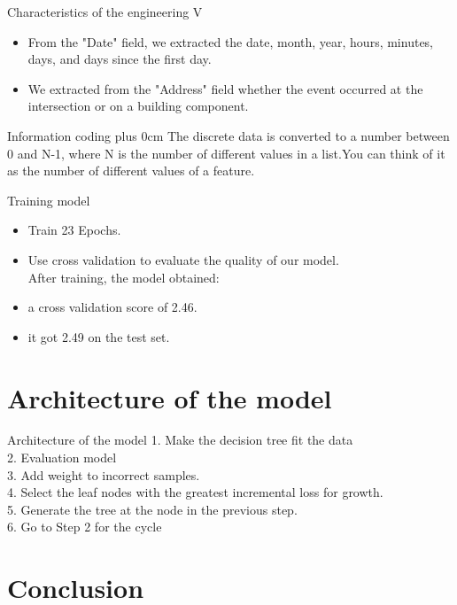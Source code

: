 \documentclass[
 size=14pt,
 paper=smartboard,  %
 mode=present, 		%
 display=slides, 	%
 style=tuliplab,  	%
 pauseslide,
 fleqn,leqno]{powerdot}
\renewcommand{\raggedright}{\leftskip=0pt \rightskip=0pt plus 0cm}
\begin{document}
\begin{slide}[toc=,bm=]{Characteristics of the engineering V}
	\begin{itemize}
		\item From the "Date" field, we extracted the date, month, year, hours, minutes, days, and days since the first day.
		\item We extracted from the "Address" field whether the event occurred at the intersection or on a building component.
	\end{itemize}
\end{slide}
\begin{slide}{Information coding}
	\raggedright
	The discrete data is converted to a number between 0 and N-1, where N is the number of different values in a list.You can think of it as the number of different values of a feature.
\end{slide}
\begin{slide}{Training model}
	\begin{itemize}
	\item Train 23 Epochs.
	\item Use cross validation to evaluate the quality of our model.\\
	After training, the model obtained:
	\item a cross validation score of 2.46.
	\item it got 2.49 on the test set.
	\end{itemize}
\end{slide}

\section{Architecture of the model}

\begin{slide}{Architecture of the model}
1. Make the decision tree fit the data\\
2. Evaluation model\\
3. Add weight to incorrect samples.\\
4. Select the leaf nodes with the greatest incremental loss for growth.\\
5. Generate the tree at the node in the previous step.\\
6. Go to Step 2 for the cycle\\
\end{slide}

\section{Conclusion}
\end{document}
